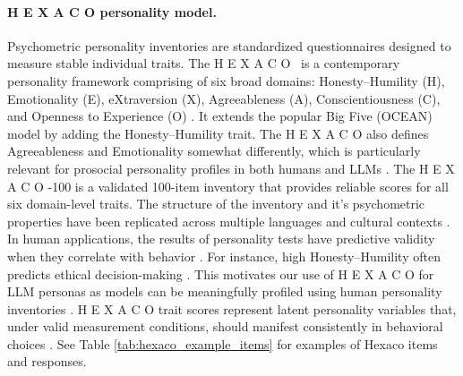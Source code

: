 \documentclass[11pt]{article}
\newcommand{\hexaco}{%
  {\textcolor{hexH}{H}}%
  {\textcolor{hexE}{E}}%
  {\textcolor{hexX}{X}}%
  {\textcolor{hexA}{A}}%
  {\textcolor{hexC}{C}}%
  {\textcolor{hexO}{O}}%
}
\begin{document}
\paragraph{\hexaco\;personality model.}
Psychometric personality inventories are standardized questionnaires designed to measure stable individual traits. The \hexaco\ is a contemporary personality framework comprising of six broad domains: \textcolor{hexH}{\textcolor{hexH}{Honesty–Humility}} (\textcolor{hexH}{H}), \textcolor{hexE}{Emotionality} (\textcolor{hexE}{E}), \textcolor{hexX}{eXtraversion} (\textcolor{hexX}{X}), \textcolor{hexA}{Agreeableness} (\textcolor{hexA}{A}), \textcolor{hexC}{Conscientiousness} (\textcolor{hexC}{C}), and \textcolor{hexO}{Openness to Experience} (\textcolor{hexO}{O}) \cite{ashton2007empirical}. It extends the popular Big Five (OCEAN) model by adding the \textcolor{hexH}{\textcolor{hexH}{Honesty–Humility}} trait. The \hexaco\; also defines \textcolor{hexA}{Agreeableness} and \textcolor{hexE}{Emotionality} somewhat differently, which is particularly relevant for prosocial personality profiles in both humans \cite{ashton2014hexaco, hilbig2014boast} and LLMs \cite{bodrovza2024personality}. The \hexaco-100 is a validated 100-item inventory that provides reliable scores for all six domain-level traits. The structure of the inventory and it's psychometric properties have been replicated across multiple languages and cultural contexts \cite{lee2018psychometric}. In human applications, the results of personality tests have predictive validity when they correlate with behavior \cite{pletzer2021hexaco}. 
For instance, high \textcolor{hexH}{Honesty–Humility} often predicts ethical decision-making \cite{ashton2008prediction}. This motivates our use of \hexaco\; for LLM personas as models can be meaningfully profiled using human personality inventories \cite{pellert2024ai, kruijssen2025deterministic, li2024automatic}. \hexaco\; trait scores represent latent personality variables that, under valid measurement conditions, should manifest consistently in behavioral choices \cite{west2012model}.
See Table \ref{tab:hexaco_example_items} for examples of Hexaco items and responses.
\end{document}
